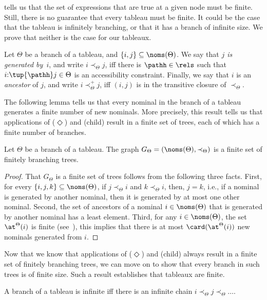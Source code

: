  tells us that the set of expressions that are true at a given node must be finite. Still, there is no guarantee that every tableau must be finite. It could be the case that the tableau is infinitely branching, or that it has a branch of infinite size. We prove that neither is the case for our tableaux.

\begin{defi} \label{def:generated}
  Let $\Theta$ be a branch of a tableau, and $\{i, j\} \subseteq \noms(\Theta)$.
  We say that \emph{$j$ is generated by~$i$}, and write $i \prec_\Theta j$, iff there is $\pathh\in\rels$ such that $i{:}\tup{\pathh}j\in\Theta$ is an accessibility constraint. 
  Finally, we say that $i$ is an \emph{ancestor} of $j$, 
    and write $i \prec_\Theta^{+} j$,
  iff $(i,j)$ is in the transitive closure of $\prec_\Theta$.
\end{defi}

The following lemma tells us that every nominal in the branch of a tableau generates a finite number of new nominals. More precisely, this result tells us that applications of ($\Diamond$) and (child) result in a finite set of trees, each of which has a finite number of branches.

\begin{lem} \label{lemma:graph}
  Let $\Theta$ be a branch of a tableau.
  The graph $G_{\Theta} = (\noms(\Theta), \prec_\Theta)$ is a finite set of finitely branching trees.
\end{lem}
\begin{proof}
  That $G_{\Theta}$ is a finite set of trees follows from the following three facts.
  First, for every $\{i,j,k\} \subseteq \noms(\Theta)$, if $j \prec_\Theta i$ and $k \prec_\Theta i$, then, $j = k$, i.e., if a nominal is generated by another nominal, then it is generated by at most one other nominal.
  Second, the set of ancestors of a nominal $i \in \noms(\Theta)$ that is generated by another nominal has a least element.
  Third, for any $i \in \noms(\Theta)$, the set $\at^\Theta(i)$ is finite (see~), this implies that there is at most $\card(\at^\Theta(i))$ new nominals generated from $i$.
\end{proof}

Now that we know that applications of ($\Diamond$) and (child) always result in a finite set of finitely branching trees, we can move on to show that every branch in such trees is of finite size. Such a result establishes that tableaux are finite. 

\begin{lem} \label{lemma:chain{:}infinite}
  A branch of a tableau is infinite iff there is an infinite chain $i \prec_\Theta j  \prec_\Theta \dots$.
\end{lem}

